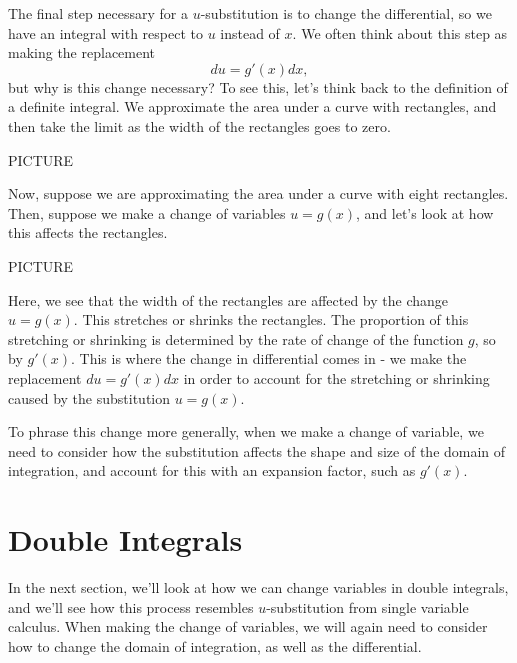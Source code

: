 \documentclass{ximera}
\begin{document}
The final step necessary for a $u$-substitution is to change the differential, so we have an integral with respect to $u$ instead of $x$. We often think about this step as making the replacement
\[
du = g'(x)dx,
\]
but why is this change necessary? To see this, let's think back to the definition of a definite integral. We approximate the area under a curve with rectangles, and then take the limit as the width of the rectangles goes to zero.

PICTURE

Now, suppose we are approximating the area under a curve with eight rectangles. Then, suppose we make a change of variables $u=g(x)$, and let's look at how this affects the rectangles.

PICTURE

Here, we see that the width of the rectangles are affected by the change $u=g(x)$. This stretches or shrinks the rectangles. The proportion of this stretching or shrinking is determined by the rate of change of the function $g$, so by $g'(x)$. This is where the change in differential comes in - we make the replacement $du = g'(x)dx$ in order to account for the stretching or shrinking caused by the substitution $u=g(x)$.

To phrase this change more generally, when we make a change of variable, we need to consider how the substitution affects the shape and size of the domain of integration, and account for this with an expansion factor, such as $g'(x)$.

\section*{Double Integrals}

In the next section, we'll look at how we can change variables in double integrals, and we'll see how this process resembles $u$-substitution from single variable calculus. When making the change of variables, we will again need to consider how to change the domain of integration, as well as the differential.
\end{document}
